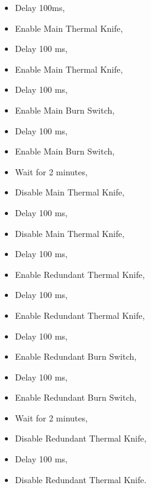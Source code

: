 

\begin{itemize}        
    \item Delay 100ms,                   
                                   
    \item Enable Main Thermal Knife,      
    \item Delay 100 ms,                   
    \item Enable Main Thermal Knife,       
    \item Delay 100 ms,                   
    \item Enable Main Burn Switch,        
    \item Delay 100 ms,                   
    \item Enable Main Burn Switch,         
                            
    \item Wait for 2 minutes,                 
                            
    \item Disable Main Thermal Knife,      
    \item Delay 100 ms,                   
    \item Disable Main Thermal Knife,      
    \item Delay 100 ms,                   
    \item Enable Redundant Thermal Knife,  
    \item Delay 100 ms,                   
    \item Enable Redundant Thermal Knife,  
    \item Delay 100 ms,                   
    \item Enable Redundant Burn Switch,    
    \item Delay 100 ms,                   
    \item Enable Redundant Burn Switch,    
                                
    \item Wait for 2 minutes,                 
                                
    \item Disable Redundant Thermal Knife, 
    \item Delay 100 ms,                   
    \item Disable Redundant Thermal Knife.
\end{itemize}
